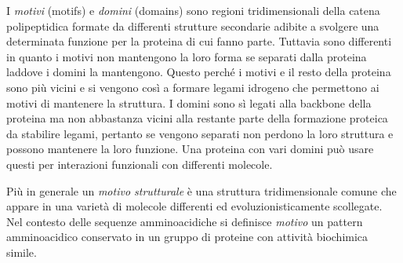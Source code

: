 {{\par I \textit{motivi} (motifs) e \textit{domini} (domains) sono regioni tridimensionali della catena polipeptidica formate da differenti strutture secondarie adibite a svolgere una determinata funzione per la proteina di cui fanno parte. Tuttavia sono differenti in quanto i motivi non mantengono la loro forma se separati dalla proteina laddove i domini la mantengono. Questo perché i motivi e il resto della proteina sono più vicini e si vengono così a formare legami idrogeno che permettono ai motivi di mantenere la struttura. I domini sono sì legati alla backbone della proteina ma non abbastanza vicini alla restante parte della formazione proteica da stabilire legami, pertanto se vengono separati non perdono la loro struttura e possono mantenere la loro funzione. Una proteina con vari domini può usare questi per interazioni funzionali con differenti molecole.

\par Più in generale un \textit{motivo strutturale} è una struttura tridimensionale comune che appare in una varietà di molecole differenti ed evoluzionisticamente scollegate. Nel contesto delle sequenze amminoacidiche si definisce \textit{motivo} un pattern amminoacidico conservato in un gruppo di proteine con attività biochimica simile.

}}
